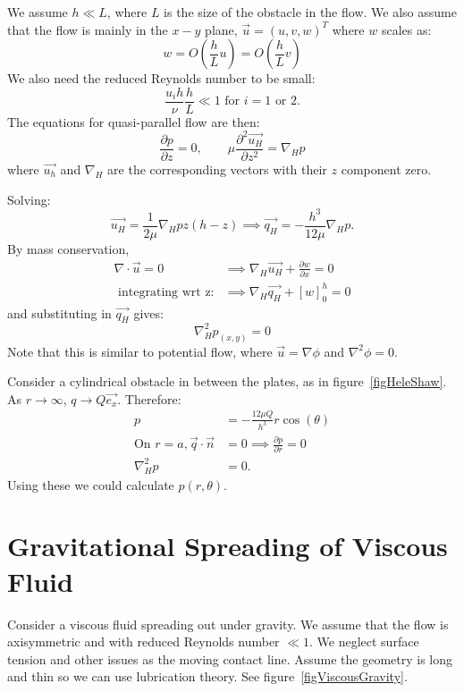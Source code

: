 \documentclass[../Main.tex]{subfiles}
\begin{document}
We assume $h \ll L$, where $L$ is the size of the obstacle in the flow. We also assume that the flow is mainly in the $x-y$ plane, $\vec u = (u, v, w)^T$ where $w$ scales as:
\begin{equation*}
    w = O\left(\frac{h}{L}u\right) = O\left(\frac{h}{L}v\right)
\end{equation*}
We also need the reduced Reynolds number to be small:
\begin{equation*}
    \frac{u_i h}{\nu} \frac{h}{L} \ll 1 \text{ for $i = 1$ or $2$.}
\end{equation*}
The equations for quasi-parallel flow are then:
\begin{equation*}
    \frac{\partial p}{\partial z} = 0,\qquad \mu \frac{\partial^{2}\vec{u_H}}{\partial z^{2}} = \nabla_H p
\end{equation*}
where $\vec{u_h}$ and $\nabla_H$ are the corresponding vectors with their $z$ component zero.

Solving:
\begin{equation*}
    \vec{u_H} = \frac1{2\mu} \nabla_H p z(h-z) \implies \vec{q_H} =-\frac{h^3}{12\mu}\nabla_H p.
\end{equation*}
By mass conservation,
\begin{align*}
    \nabla \cdot \vec{u} = 0&\implies \nabla_H \vec{u_H} + \frac{\partial w}{\partial x} = 0 \\
    \text{ integrating wrt z:} &\implies \nabla_H \vec{q_H} + \left[w\right]_0^h = 0
\end{align*}
and substituting in $\vec{q_H}$ gives:
\begin{equation*}
    \nabla^2_H p_(x, y) = 0
\end{equation*}
Note that this is similar to potential flow, where $\vec{u} = \nabla \phi$ and $\nabla^2\phi = 0$.
\begin{example}
    Consider a cylindrical obstacle in between the plates, as in figure~\ref{figHeleShaw}. As $r \to \infty$, $q \to Q\vec{e_x}$. Therefore:
    \begin{align*}
        p &= -\frac{12\mu Q}{h^3} r \cos(\theta) \\
        \text{On } r = a, \vec{q} \cdot \vec{n} &= 0 \implies \frac{\partial p}{\partial r} = 0 \\
        \nabla^2_H p &= 0.
    \end{align*}
    Using these we could calculate $p(r, \theta)$.
\end{example}
\section{Gravitational Spreading of Viscous Fluid}
Consider a viscous fluid spreading out under gravity. We assume that the flow is axisymmetric and with reduced Reynolds number $\ll 1$. We neglect surface tension and other issues as the moving contact line. Assume the geometry is long and thin so we can use lubrication theory. See figure~\ref{figViscousGravity}.
\end{document}
